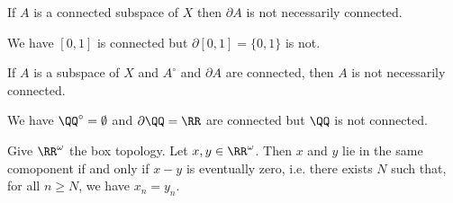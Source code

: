 \begin{example}
    If $A$ is a connected subspace of $X$ then $\partial A$ is not necessarily connected.

    We have $[0,1]$ is connected but $\partial [0,1] = \{ 0, 1 \}$ is not.
\end{example}

\begin{example}
    If $A$ is a subspace of $X$ and $A^\circ$ and $\partial A$ are connected, then $A$ is not necessarily connected.

    We have $\QQ^\circ = \emptyset$ and $\partial \QQ = \RR$ are connected but $\QQ$ is not connected.
\end{example}

\begin{proposition}
    \label{proposition:components_box_topology}
    Give $\RR^\omega$ the box topology. Let $x, y \in \RR^\omega$. Then $x$ and $y$ lie in the same comoponent if and only if $x-y$ is eventually zero, i.e.
    there exists $N$ such that, for all $n \geq N$,
    we have $x_n = y_n$.
\end{proposition}

